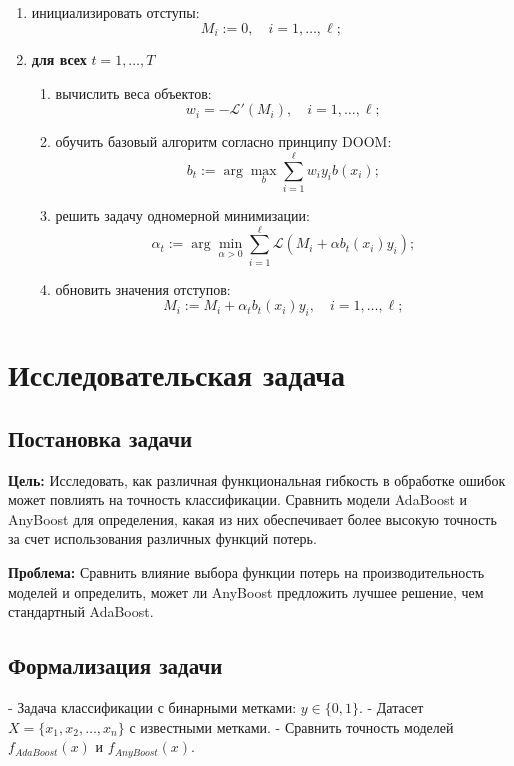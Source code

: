 \begin{enumerate}
    \item инициализировать отступы: 
    \[
    M_i := 0, \quad i = 1, \ldots, \ell;
    \]
    \item \textbf{для всех} $t = 1, \ldots, T$
    \begin{enumerate}
        \item вычислить веса объектов:
        \[
        w_i = -\mathcal{L}'(M_i), \quad i = 1, \ldots, \ell;
        \]
        \item обучить базовый алгоритм согласно принципу DOOM:
        \[
        b_t := \arg \max_{b} \sum_{i=1}^{\ell} w_i y_i b(x_i);
        \]
        \item решить задачу одномерной минимизации:
        \[
        \alpha_t := \arg \min_{\alpha > 0} \sum_{i=1}^{\ell} \mathcal{L}(M_i + \alpha b_t(x_i) y_i);
        \]
        \item обновить значения отступов:
        \[
        M_i := M_i + \alpha_t b_t(x_i) y_i, \quad i = 1, \ldots, \ell;
        \]
    \end{enumerate}
\end{enumerate}

\section*{Исследовательская задача}
\subsection*{Постановка задачи}
\textbf{Цель:} Исследовать, как различная функциональная гибкость в обработке ошибок может повлиять на точность классификации. Сравнить модели AdaBoost и AnyBoost для определения, какая из них обеспечивает более высокую точность за счет использования различных функций потерь.

\textbf{Проблема:} Сравнить влияние выбора функции потерь на производительность моделей и определить, может ли AnyBoost предложить лучшее решение, чем стандартный AdaBoost.

\subsection*{Формализация задачи}

- Задача классификации с бинарными метками: $y \in \{0, 1\}$.
- Датасет $X = \{x_1, x_2, \ldots, x_n\}$ с известными метками.
- Сравнить точность моделей $f_{AdaBoost}(x)$ и $f_{AnyBoost}(x)$.

